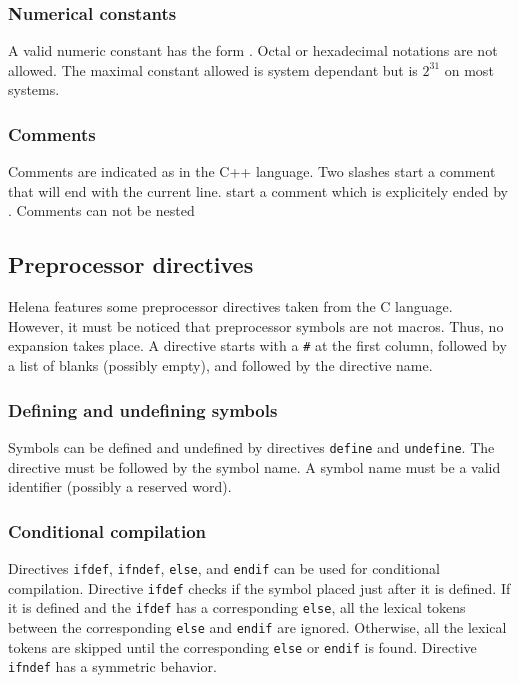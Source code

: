 \subsubsection{Numerical constants}
A valid numeric constant has the form \LS{[0-9][0-9]*}.  Octal or
hexadecimal notations are not allowed.  The maximal constant allowed
is system dependant but is $2^{31}$ on most systems.

\subsubsection{Comments}
Comments are indicated as in the C++ language.  Two slashes \LS{//}
start a comment that will end with the current line.  \LS{/*} start a
comment which is explicitely ended by \LS{*/}.  Comments can not be
nested

\subsection{Preprocessor directives}
Helena features some preprocessor directives taken from the C
language.  However, it must be noticed that preprocessor symbols are
not macros.  Thus, no expansion takes place.  A directive starts with
a \texttt{\#} at the first column, followed by a list of blanks
(possibly empty), and followed by the directive name.

\subsubsection{Defining and undefining symbols}
Symbols can be defined and undefined by directives \texttt{define} and
\texttt{undefine}.  The directive must be followed by the symbol name.
A symbol name must be a valid identifier (possibly a reserved word).

\subsubsection{Conditional compilation}
Directives \texttt{ifdef}, \texttt{ifndef}, \texttt{else}, and
\texttt{endif} can be used for conditional compilation.  Directive
\texttt{ifdef} checks if the symbol placed just after it is defined.
If it is defined and the \texttt{ifdef} has a corresponding
\texttt{else}, all the lexical tokens between the corresponding
\texttt{else} and \texttt{endif} are ignored.  Otherwise, all the
lexical tokens are skipped until the corresponding \texttt{else} or
\texttt{endif} is found.  Directive \texttt{ifndef} has a symmetric
behavior.

